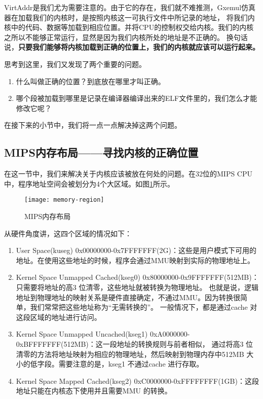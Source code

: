 VirtAddr是我们尤为需要注意的。由于它的存在，我们就不难推测，Gxemul仿真器在加载我们的内核时，是按照内核这一可执行文件中所记录的地址，
将我们内核中的代码、数据等加载到相应位置。并将CPU的控制权交给内核。我们的内核之所以不能够正常运行，显然是因为我们内核所处的地址是不正确的。
换句话说，\textbf{只要我们能够将内核加载到正确的位置上，我们的内核就应该可以运行起来。}

思考到这里，我们又发现了两个重要的问题。
\begin{enumerate}
  \item 什么叫做正确的位置？到底放在哪里才叫正确。
  \item 哪个段被加载到哪里是记录在编译器编译出来的ELF文件里的，我们怎么才能修改它呢？
\end{enumerate}
在接下来的小节中，我们将一点一点解决掉这两个问题。

\subsection{MIPS内存布局——寻找内核的正确位置}
在这一节中，我们来解决关于内核应该被放在何处的问题。在32位的MIPS CPU中，程序地址空间会被划分为4个大区域。如图\ref{fig:memory-region}所示。

\begin{figure}[htbp]
  \centering
  \texttt{[image: memory-region]}
  \caption{MIPS内存布局}\label{fig:memory-region} 
\end{figure}

从硬件角度讲，这四个区域的情况如下：

\begin{enumerate}
  \item User Space(kuseg) 0x00000000-0x7FFFFFFF(2G)：这些是用户模式下可用的地址。在使用这些地址的时候，程序会通过MMU映射到实际的物理地址上。
  \item Kernel Space Unmapped Cached(kseg0) 0x80000000-0x9FFFFFFF(512MB)：只需要将地址的高3 位清零，这些地址就被转换为物理地址。
也就是说，逻辑地址到物理地址的映射关系是硬件直接确定，不通过MMU。因为转换很简单，我们常常把这些地址称为“无需转换的”。
一般情况下，都是通过cache 对这段区域的地址进行访问。
  \item Kernel Space Unmapped Uncached(kseg1) 0xA0000000-0xBFFFFFFF(512MB)：这一段地址的转换规则与前者相似，
通过将高3 位清零的方法将地址映射为相应的物理地址，然后映射到物理内存中512MB 大小的低字段。需要注意的是，kseg1 不通过cache 进行存取。
  \item Kernel Space Mapped Cached(kseg2) 0xC0000000-0xFFFFFFFF(1GB)：这段地址只能在内核态下使用并且需要MMU 的转换。
\end{enumerate}


